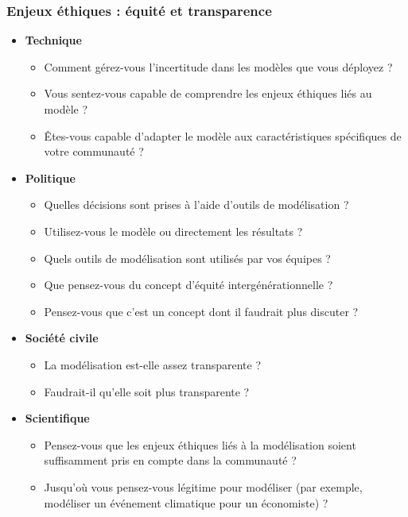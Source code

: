 \subsubsection*{Enjeux éthiques : équité et transparence}
\begin{itemize}
    \item \textbf{Technique}
    \begin{itemize}
        \item Comment gérez-vous l'incertitude dans les modèles que vous déployez ?
        \item Vous sentez-vous capable de comprendre les enjeux éthiques liés au modèle ?
        \item Êtes-vous capable d'adapter le modèle aux caractéristiques spécifiques de votre communauté ?
    \end{itemize}
    \item \textbf{Politique}
    \begin{itemize}
        \item Quelles décisions sont prises à l'aide d'outils de modélisation ?
        \item Utilisez-vous le modèle ou directement les résultats ?
        \item Quels outils de modélisation sont utilisés par vos équipes ?
        \item Que pensez-vous du concept d'équité intergénérationnelle ?
        \item Pensez-vous que c'est un concept dont il faudrait plus discuter ?
    \end{itemize}
    \item \textbf{Société civile}
    \begin{itemize}
        \item La modélisation est-elle assez transparente ?
        \item Faudrait-il qu'elle soit plus transparente ?
    \end{itemize}
    \item \textbf{Scientifique}
    \begin{itemize}
        \item Pensez-vous que les enjeux éthiques liés à la modélisation soient suffisamment pris en compte dans la communauté ?
        \item Jusqu'où vous pensez-vous légitime pour modéliser (par exemple, modéliser un événement climatique pour un économiste) ?
    \end{itemize}
\end{itemize}